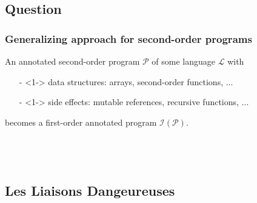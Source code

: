 \subsection*{Question}
\begin{frame}\frametitle<1->{\quad Generalizing approach for second-order programs}
\vspace*{-4em}
An annotated {\red second-order} program $\mathcal{P}$ of some language $\mathcal{L}$ with 
\begin{itemize}
\item[-]<1-> data structures: arrays, second-order functions, ...
\item[-]<1-> side effects: mutable references, recursive functions, ...
\end{itemize}
becomes a {\red first-order} annotated program $\mathcal{I(P)}$.\\[2em]

 ~ \\[0.5em]
 ~ \\[0.5em]
 ~ \\[0.5em]
\end{frame}

\subsection*{Les Liaisons Dangeureuses}

